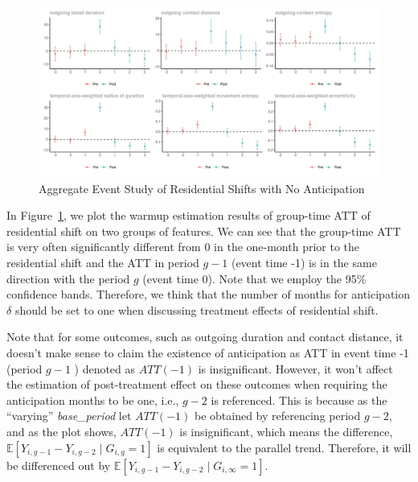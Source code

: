 \begin{figure}[h!]
\centering
\caption{Aggregate Event Study of Residential Shifts with No Anticipation}
\vspace{0.1cm}

\includegraphics[width=1\textwidth]{figures/csdid/inspect_delta/residential_shift.png}

\label{fig:select_delta_residential_shift}
\end{figure}

In Figure~\ref{fig:select_delta_residential_shift}, we plot the warmup estimation results of group-time ATT of residential shift on two groups of features.
We can see that the group-time ATT is very often significantly different from 0 in the one-month prior to the residential shift and the ATT in period \( g-1 \) (event time -1) is in the same direction with the period \( g \) (event time 0).
Note that we employ the 95\% confidence bands.
Therefore, we think that the number of months for anticipation \( \delta \)	 should be set to one when discussing treatment effects of residential shift.

Note that for some outcomes, such as outgoing duration and contact distance, it doesn't make sense to claim the existence of anticipation as ATT in event time -1 (period \( g-1 \)	) denoted as \( ATT(-1) \) is insignificant.
However, it won't affect the estimation of post-treatment effect on these outcomes when requiring the anticipation months to be one, i.e., \( g-2 \) is referenced.
This is because as the ``varying'' \textit{base\_period} let $ATT(-1)$ be obtained by referencing period $g-2$, and as the plot shows, $ATT(-1)$ is insignificant, which means the difference, $\mathbb{E}[Y_{i, g-1} - Y_{i, g-2} \mid G_{i, g} = 1]$ is equivalent to the parallel trend. Therefore, it will be differenced out by $\mathbb{E}[Y_{i, g-1} - Y_{i, g-2} \mid G_{i, \infty} = 1]$.


